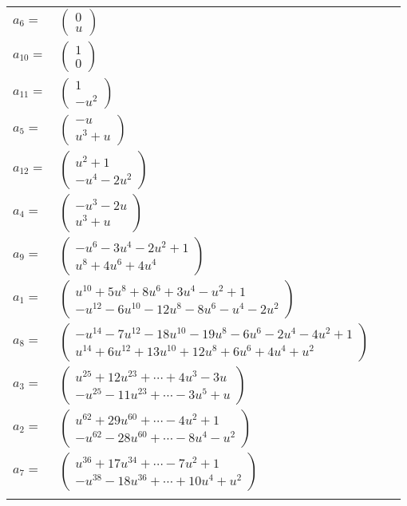 \documentclass[1p]{elsarticle_modified}
\theoremstyle{definition}
\begin{document}
\begin{tabular}{m{7pt} m{180pt} m{7pt} m{180pt} }
\flushright $a_{6}=$&$\begin{pmatrix}0\\u\end{pmatrix}$ \\
\flushright $a_{10}=$&$\begin{pmatrix}1\\0\end{pmatrix}$ \\
\flushright $a_{11}=$&$\begin{pmatrix}1\\- u^2\end{pmatrix}$ \\
\flushright $a_{5}=$&$\begin{pmatrix}- u\\u^3+u\end{pmatrix}$ \\
\flushright $a_{12}=$&$\begin{pmatrix}u^2+1\\- u^4-2 u^2\end{pmatrix}$ \\
\flushright $a_{4}=$&$\begin{pmatrix}- u^3-2 u\\u^3+u\end{pmatrix}$ \\
\flushright $a_{9}=$&$\begin{pmatrix}- u^6-3 u^4-2 u^2+1\\u^8+4 u^6+4 u^4\end{pmatrix}$ \\
\flushright $a_{1}=$&$\begin{pmatrix}u^{10}+5 u^8+8 u^6+3 u^4- u^2+1\\- u^{12}-6 u^{10}-12 u^8-8 u^6- u^4-2 u^2\end{pmatrix}$ \\
\flushright $a_{8}=$&$\begin{pmatrix}- u^{14}-7 u^{12}-18 u^{10}-19 u^8-6 u^6-2 u^4-4 u^2+1\\u^{14}+6 u^{12}+13 u^{10}+12 u^8+6 u^6+4 u^4+u^2\end{pmatrix}$ \\
\flushright $a_{3}=$&$\begin{pmatrix}u^{25}+12 u^{23}+\cdots+4 u^3-3 u\\- u^{25}-11 u^{23}+\cdots-3 u^5+u\end{pmatrix}$ \\
\flushright $a_{2}=$&$\begin{pmatrix}u^{62}+29 u^{60}+\cdots-4 u^2+1\\- u^{62}-28 u^{60}+\cdots-8 u^4- u^2\end{pmatrix}$ \\
\flushright $a_{7}=$&$\begin{pmatrix}u^{36}+17 u^{34}+\cdots-7 u^2+1\\- u^{38}-18 u^{36}+\cdots+10 u^4+u^2\end{pmatrix}$\\&\end{tabular}
\end{document}
